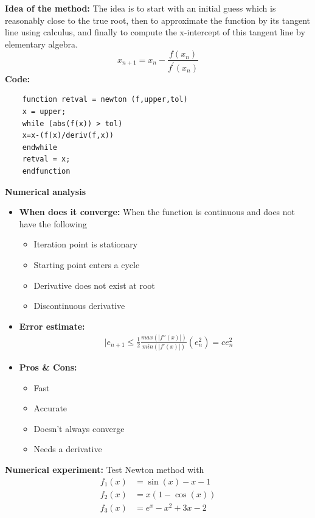 \documentclass{article}
\begin{document}
	{\bf Idea of the method:} 
	The idea is to start with an initial guess which is reasonably close to the true root, then to approximate the function by its tangent line using calculus, and finally to compute the x-intercept of this tangent line by elementary algebra.\\
	\[x _ { n + 1 } = x _ { n } - \frac { f \left( x _ { n } \right) } { f ^ { \prime } \left( x _ { n } \right) }\]
	{\bf Code:}
	\begin{verbatim}
	function retval = newton (f,upper,tol)
	x = upper;
	while (abs(f(x)) > tol)
	x=x-(f(x)/deriv(f,x))
	endwhile
	retval = x;
	endfunction
	\end{verbatim}
	{\bf Numerical analysis}
	\begin{itemize}
		\item{\bf When does it converge:} When the function is continuous and does not have the following
		\begin{itemize}
			\item Iteration point is stationary
			\item Starting point enters a cycle
			\item Derivative does not exist at root
			\item Discontinuous derivative
		\end{itemize}
		\item {\bf Error estimate:}
		\begin{equation}
		\begin{split}
		& |e_{n+1}\leq \frac{1}{2}\frac{max(|f''(x)|)}{min(|f'(x)|)}(e_n^2)=ce_n^2
		\end{split}
		\end{equation}
		\item {\bf Pros \& Cons:}
		\begin{itemize}
			\item Fast
			\item Accurate
			\item Doesn't always converge
			\item Needs a derivative
		\end{itemize}
	\end{itemize}
	{\bf Numerical experiment:}
	Test Newton method with 
	\begin{align*} f _ { 1 } ( x ) & = \sin ( x ) - x - 1 \\ f _ { 2 } ( x ) & = x ( 1 - \cos ( x ) ) \\ f _ { 3 } ( x ) & = e ^ { x } - x ^ { 2 } + 3 x - 2 \end{align*}
	
\end{document}

